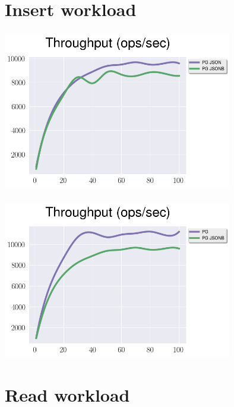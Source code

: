 \documentclass[usenames,dvipsnames, 18pt, compress, aspectratio=169]{beamer}
\begin{document}
\fontsize{13pt}{14}\selectfont
\section{Insert workload}
\fontsize{17pt}{18}\selectfont

\begin{frame}
    \frametitle{}
    \begin{center}

        \includegraphics[width=0.75\textwidth,center]{json_vs_jsonb_insert.png}

    \end{center}
\end{frame}

\begin{frame}
    \frametitle{}
    \begin{center}

        \includegraphics[width=0.75\textwidth,center]{jsonb_vs_relation_insert.png}

    \end{center}
\end{frame}

\fontsize{13pt}{14}\selectfont
\section{Read workload}
\fontsize{17pt}{18}\selectfont
\end{document}
